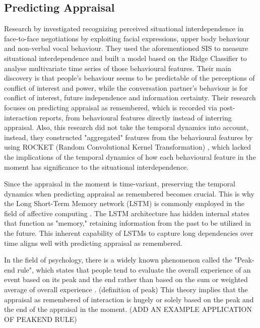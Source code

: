 \subsection{Predicting Appraisal}
Research by \citeauthor{recorgnizing2021Dudzik} \cite{recorgnizing2021Dudzik} investigated recognizing perceived situational interdependence in face-to-face negotiations by exploiting facial expressions, upper body behaviour and non-verbal vocal behaviour. They used the aforementioned SIS to measure situational interdependence and built a model based on the Ridge Classifier to analyse multivariate time series of those behavioural features. Their main discovery is that people's behaviour seems to be predictable of the perceptions of conflict of interest and power, while the conversation partner's behaviour is for conflict of interest, future independence and information certainty. Their research focuses on predicting appraisal as remembered, which is recorded via post-interaction reports, from behavioural features directly instead of interring appraisal. Also, this research did not take the temporal dynamics into account, instead, they constructed "aggregated" features from the behavioural features by using ROCKET (Random Convolutional Kernel Transformation) \cite{dempster2021minirocket}, which lacked the implications of the temporal dynamics of how each behavioural feature in the moment has significance to the situational interdependence.

Since the appraisal in the moment is time-variant, preserving the temporal dynamics when predicting appraisal as remembered becomes crucial. This is why the Long Short-Term Memory network (LSTM) is commonly employed in the field of affective computing \cite{ong2019modeling}. The LSTM architecture has hidden internal states that function as "memory," retaining information from the past to be utilized in the future. This inherent capability of LSTMs to capture long dependencies over time aligns well with predicting appraisal as remembered. 

In the field of psychology, there is a widely known phenomenon called the "Peak-end rule", which states that people tend to evaluate the overall experience of an event based on its peak and the end rather than based on the sum or weighted average of overall experience \cite{kahneman2000evaluation}. (definition of peak) This theory implies that the appraisal as remembered of interaction is hugely or solely based on the peak and the end of the appraisal in the moment. (ADD AN EXAMPLE APPLICATION OF PEAKEND RULE)

